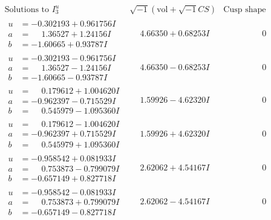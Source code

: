 \documentclass[1p]{elsarticle_modified}
\theoremstyle{definition}
\newcommand{\I}{\sqrt{-1}}
\begin{document}
$$\begin{array}{c|c|c}  
\text{Solutions to }I^u_{3}& \I (\text{vol} + \sqrt{-1}CS) & \text{Cusp shape}\\
 \hline 
\begin{aligned}
u &= -0.302193 + 0.961756 I \\
a &= \phantom{-}1.36527 + 1.24156 I \\
b &= -1.60665 + 0.93787 I\end{aligned}
 & \phantom{-}4.66350 + 0.68253 I & \phantom{-0.000000 } 0 \\ \hline\begin{aligned}
u &= -0.302193 - 0.961756 I \\
a &= \phantom{-}1.36527 - 1.24156 I \\
b &= -1.60665 - 0.93787 I\end{aligned}
 & \phantom{-}4.66350 - 0.68253 I & \phantom{-0.000000 } 0 \\ \hline\begin{aligned}
u &= \phantom{-}0.179612 + 1.004620 I \\
a &= -0.962397 - 0.715529 I \\
b &= \phantom{-}0.545979 - 1.095360 I\end{aligned}
 & \phantom{-}1.59926 - 4.62320 I & \phantom{-0.000000 } 0 \\ \hline\begin{aligned}
u &= \phantom{-}0.179612 - 1.004620 I \\
a &= -0.962397 + 0.715529 I \\
b &= \phantom{-}0.545979 + 1.095360 I\end{aligned}
 & \phantom{-}1.59926 + 4.62320 I & \phantom{-0.000000 } 0 \\ \hline\begin{aligned}
u &= -0.958542 + 0.081933 I \\
a &= \phantom{-}0.753873 - 0.799079 I \\
b &= -0.657149 + 0.827718 I\end{aligned}
 & \phantom{-}2.62062 + 4.54167 I & \phantom{-0.000000 } 0 \\ \hline\begin{aligned}
u &= -0.958542 - 0.081933 I \\
a &= \phantom{-}0.753873 + 0.799079 I \\
b &= -0.657149 - 0.827718 I\end{aligned}
 & \phantom{-}2.62062 - 4.54167 I & \phantom{-0.000000 } 0 \\ \hline\begin{aligned}

\end{aligned}
\end{array}$$
\end{document}
